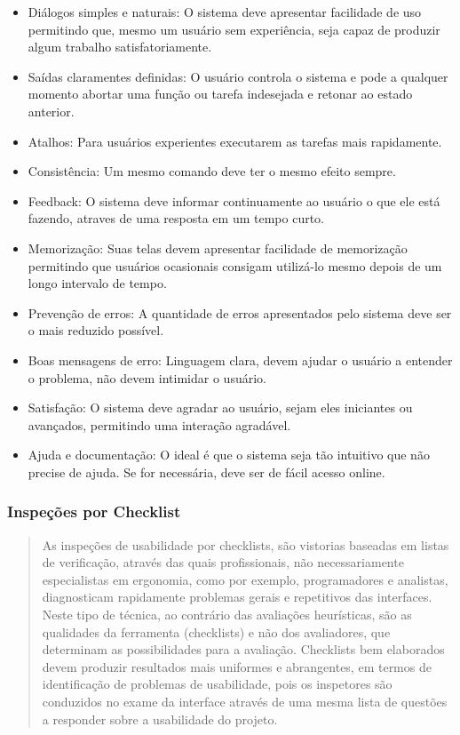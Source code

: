 \begin{itemize}
  \item Diálogos simples e naturais: O sistema deve apresentar facilidade de uso permitindo que, mesmo um usuário sem experiência, seja capaz de produzir algum trabalho satisfatoriamente.
  \item Saídas claramentes definidas: O usuário controla o sistema e pode a qualquer momento abortar uma função ou tarefa indesejada e retonar ao estado anterior.
  \item Atalhos: Para usuários experientes executarem as tarefas mais rapidamente.
  \item Consistência: Um mesmo comando deve ter o mesmo efeito sempre. 
  \item Feedback: O sistema deve informar continuamente ao usuário o que ele está fazendo, atraves de uma resposta em um tempo curto.
  \item Memorização: Suas telas devem apresentar facilidade de memorização permitindo que usuários ocasionais consigam utilizá-lo mesmo depois de um longo intervalo de tempo.
  \item Prevenção de erros: A quantidade de erros apresentados pelo sistema deve ser o mais reduzido possível.
  \item Boas mensagens de erro: Linguagem clara, devem ajudar o usuário a entender o problema, não devem intimidar o usuário.
  \item Satisfação: O sistema deve agradar ao usuário, sejam eles iniciantes ou avançados, permitindo uma interação agradável.
  \item Ajuda e documentação: O ideal é que o sistema seja tão intuitivo que não precise de ajuda. Se for necessária, deve ser de fácil acesso online.
\end{itemize}


\subsubsection{Inspeções por Checklist}

\begin{quote}
As inspeções de usabilidade por checklists, são vistorias baseadas em listas de verificação, através das quais profissionais, não necessariamente especialistas em ergonomia, como por exemplo, programadores e analistas, diagnosticam rapidamente problemas gerais e repetitivos das interfaces. Neste tipo de técnica, ao contrário das avaliações heurísticas, são as qualidades da ferramenta (checklists) e não dos avaliadores, que determinam as possibilidades para a avaliação. Checklists bem elaborados devem produzir resultados mais uniformes e abrangentes, em termos de identificação de problemas de usabilidade, pois os inspetores são conduzidos no exame da interface através de uma mesma lista de questões a responder sobre a usabilidade do projeto.
\cite{cybil_apostila}
\end{quote} 


